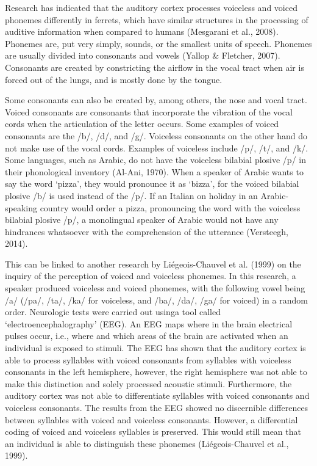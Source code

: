 Research has indicated that the auditory cortex processes voiceless and voiced phonemes differently in ferrets, which have similar structures in the processing of auditive information when compared to humans (Mesgarani et al., 2008). Phonemes are, put very simply, sounds, or the smallest units of speech. Phonemes are usually divided into consonants and vowels (Yallop \& Fletcher, 2007). Consonants are created by constricting the airflow in the vocal tract when air is forced out of the lungs, and is mostly done by the tongue. 

Some consonants can also be created by, among others, the nose and vocal tract. Voiced consonants are consonants that incorporate the vibration of the vocal cords when the articulation of the letter occurs. Some examples of voiced consonants are the /b/, /d/, and /g/. Voiceless consonants on the other hand do not make use of the vocal cords. Examples of voiceless include /p/, /t/, and /k/. Some languages, such as Arabic, do not have the voiceless bilabial plosive /p/ in their phonological inventory (Al-Ani, 1970). When a speaker of Arabic wants to say the word ‘pizza’, they would pronounce it as ‘bizza’, for the voiced bilabial plosive /b/ is used instead of the /p/. If an Italian on holiday in an Arabic-speaking country would order a pizza, pronouncing the word with the voiceless bilabial plosive /p/, a monolingual speaker of Arabic would not have any hindrances whatsoever with the comprehension of the utterance (Versteegh, 2014). 

This can be linked to another research by Liégeois-Chauvel et al. (1999) on the inquiry of the perception of voiced and voiceless phonemes. In this research, a speaker produced voiceless and voiced phonemes, with the following vowel being /a/ (/pa/, /ta/, /ka/ for voiceless, and /ba/, /da/, /ga/ for voiced) in a random order. Neurologic tests were carried out usinga tool called ‘electroencephalography’ (EEG). An EEG maps where in the brain electrical pulses occur, i.e., where and which areas of the brain are activated when an individual is exposed to stimuli. The EEG has shown that the auditory cortex is able to process syllables with voiced consonants from syllables with voiceless consonants in the left hemisphere, however, the right hemisphere was not able to make this distinction and solely processed acoustic stimuli. Furthermore, the auditory cortex was not able to differentiate syllables with voiced consonants and voiceless consonants. The results from the EEG showed no discernible differences between syllables with voiced and voiceless consonants. However, a differential coding of voiced and voiceless syllables is preserved. This would still mean that an individual is able to distinguish these phonemes (Liégeois-Chauvel et al., 1999).


